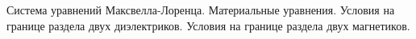\documentclass[__main__.tex]{subfiles}
\begin{document}
Система уравнений Максвелла-Лоренца. Материальные уравнения. Условия на границе раздела двух диэлектриков. Условия на границе раздела двух магнетиков.\\ 

\end{document}
